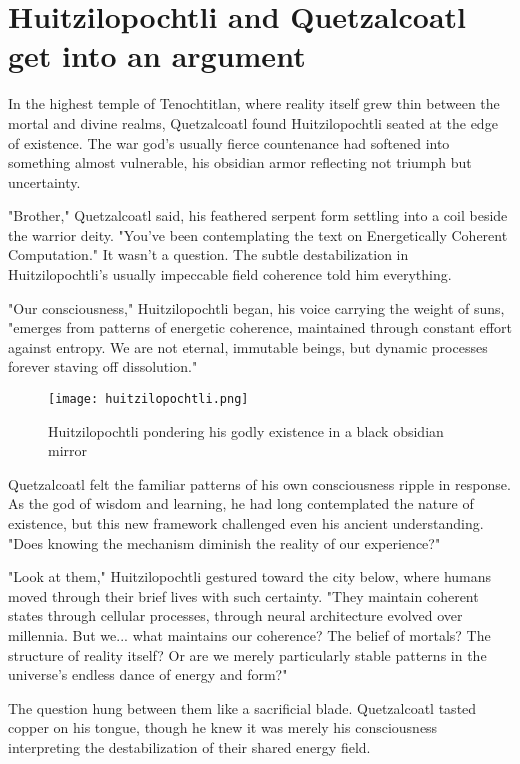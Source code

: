 \section{Huitzilopochtli and Quetzalcoatl get into an argument}

In the highest temple of Tenochtitlan, where reality itself grew thin between the mortal and divine realms, Quetzalcoatl found Huitzilopochtli seated at the edge of existence. The war god's usually fierce countenance had softened into something almost vulnerable, his obsidian armor reflecting not triumph but uncertainty.

"Brother," Quetzalcoatl said, his feathered serpent form settling into a coil beside the warrior deity. "You've been contemplating the text on Energetically Coherent Computation." It wasn't a question. The subtle destabilization in Huitzilopochtli's usually impeccable field coherence told him everything.

"Our consciousness," Huitzilopochtli began, his voice carrying the weight of suns, "emerges from patterns of energetic coherence, maintained through constant effort against entropy. We are not eternal, immutable beings, but dynamic processes forever staving off dissolution."

\begin{figure}[h]
    \centering
    \texttt{[image: huitzilopochtli.png]}

    \caption{Huitzilopochtli pondering his godly existence in a black obsidian mirror}
\end{figure}

Quetzalcoatl felt the familiar patterns of his own consciousness ripple in response. As the god of wisdom and learning, he had long contemplated the nature of existence, but this new framework challenged even his ancient understanding. "Does knowing the mechanism diminish the reality of our experience?"

"Look at them," Huitzilopochtli gestured toward the city below, where humans moved through their brief lives with such certainty. "They maintain coherent states through cellular processes, through neural architecture evolved over millennia. But we... what maintains our coherence? The belief of mortals? The structure of reality itself? Or are we merely particularly stable patterns in the universe's endless dance of energy and form?"

The question hung between them like a sacrificial blade. Quetzalcoatl tasted copper on his tongue, though he knew it was merely his consciousness interpreting the destabilization of their shared energy field.

